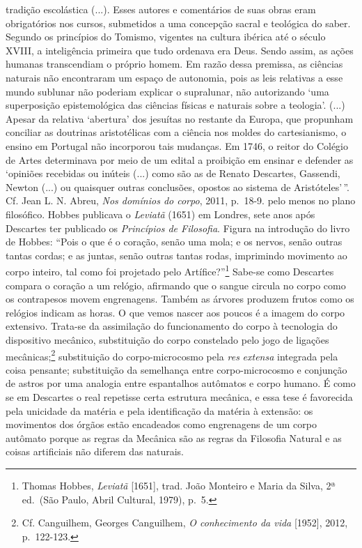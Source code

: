 {  tradição escolástica (...). Esses autores e comentários de suas obras
  eram obrigatórios nos cursos, submetidos a uma concepção sacral e
  teológica do saber. Segundo os princípios do Tomismo, vigentes na
  cultura ibérica até o século XVIII, a inteligência primeira que tudo
  ordenava era Deus. Sendo assim, as ações humanas transcendiam o
  próprio homem. Em razão dessa premissa, as ciências naturais não
  encontraram um espaço de autonomia, pois as leis relativas a esse
  mundo sublunar não poderiam explicar o supralunar, não autorizando
  `uma superposição epistemológica das ciências físicas e naturais sobre
  a teologia'. (...) Apesar da relativa `abertura' dos jesuítas no
  restante da Europa, que propunham conciliar as doutrinas aristotélicas
  com a ciência nos moldes do cartesianismo, o ensino em Portugal não
  incorporou tais mudanças. Em 1746, o reitor do Colégio de Artes
  determinava por meio de um edital a proibição em ensinar e defender as
  `opiniões recebidas ou inúteis (...) como são as de Renato Descartes,
  Gassendi, Newton (...) ou quaisquer outras conclusões, opostos ao
  sistema de Aristóteles'\,''. Cf. Jean L. N. Abreu, \emph{Nos domínios
  do corpo}, 2011, p.~18-9.} pelo menos no plano filosófico. Hobbes
publicava o \emph{Leviatã} (1651) em Londres, sete anos após Descartes
ter publicado os \emph{Princípios de Filosofia}. Figura na introdução do
livro de Hobbes: ``Pois o que é o coração, senão uma mola; e os nervos,
senão outras tantas cordas; e as juntas, senão outras tantas rodas,
imprimindo movimento ao corpo inteiro, tal como foi projetado pelo
Artífice?''\footnote{Thomas Hobbes, \emph{Leviatã} {[}1651{]}, trad.
  João Monteiro e Maria da Silva, 2ª ed.~(São Paulo, Abril Cultural,
  1979), p.~5.} Sabe-se como Descartes compara o coração a um relógio,
afirmando que o sangue circula no corpo como os contrapesos movem
engrenagens. Também as árvores produzem frutos como os relógios indicam
as horas. O que vemos nascer aos poucos é a imagem do corpo extensivo.
Trata-se da assimilação do funcionamento do corpo à tecnologia do
dispositivo mecânico, substituição do corpo constelado pelo jogo de
ligações mecânicas;\footnote{Cf. Canguilhem, Georges Canguilhem, \emph{O
  conhecimento da vida} {[}1952{]}, 2012, p.~122-123.} substituição do
corpo-microcosmo pela \emph{res} \emph{extensa} integrada pela coisa
pensante; substituição da semelhança entre corpo-microcosmo e conjunção
de astros por uma analogia entre espantalhos autômatos e corpo humano. É
como se em Descartes o real repetisse certa estrutura mecânica, e essa
tese é favorecida pela unicidade da matéria e pela identificação da
matéria à extensão: os movimentos dos órgãos estão encadeados como
engrenagens de um corpo autômato porque as regras da Mecânica são as
regras da Filosofia Natural e as coisas artificiais não diferem das
naturais.

